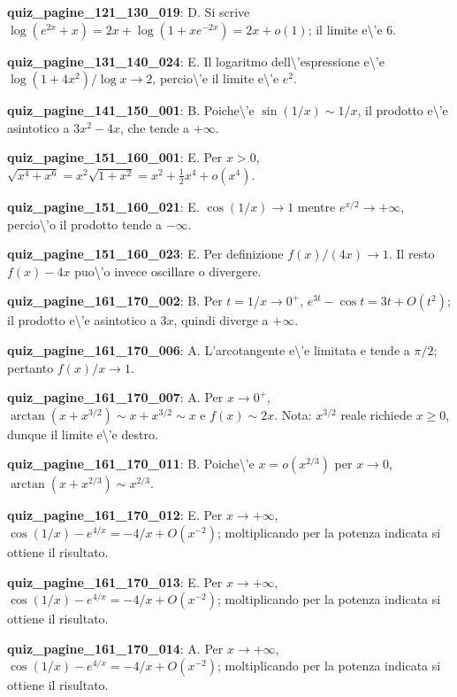 \documentclass[11pt,a4paper]{article}
\newcounter{quiz}
\begin{document}
\noindent\textbf{quiz\_pagine\_121\_130\_019}: D. Si scrive $\log(e^{2x}+x)=2x+\log(1+xe^{-2x})=2x+o(1)$; il limite e\textbackslash{}'e $6$.\par\medskip
\noindent\textbf{quiz\_pagine\_131\_140\_024}: E. Il logaritmo dell\textbackslash{}'espressione e\textbackslash{}'e $\log(1+4x^2)/\log x\to2$, percio\textbackslash{}'e il limite e\textbackslash{}'e $e^2$.\par\medskip
\noindent\textbf{quiz\_pagine\_141\_150\_001}: B. Poiche\textbackslash{}'e $\sin(1/x)\sim1/x$, il prodotto e\textbackslash{}'e asintotico a $3x^2-4x$, che tende a $+\infty$.\par\medskip
\noindent\textbf{quiz\_pagine\_151\_160\_001}: E. Per $x>0$, $\sqrt{x^4+x^6}=x^2\sqrt{1+x^2}=x^2+\frac12x^4+o(x^4)$.\par\medskip
\noindent\textbf{quiz\_pagine\_151\_160\_021}: E. $\cos(1/x)\to1$ mentre $e^{x/2}\to+\infty$, percio\textbackslash{}'o il prodotto tende a $-\infty$.\par\medskip
\noindent\textbf{quiz\_pagine\_151\_160\_023}: E. Per definizione $f(x)/(4x)\to1$. Il resto $f(x)-4x$ puo\textbackslash{}'o invece oscillare o divergere.\par\medskip
\noindent\textbf{quiz\_pagine\_161\_170\_002}: B. Per $t=1/x\to0^+$, $e^{3t}-\cos t=3t+O(t^2)$; il prodotto e\textbackslash{}'e asintotico a $3x$, quindi diverge a $+\infty$.\par\medskip
\noindent\textbf{quiz\_pagine\_161\_170\_006}: A. L'arcotangente e\textbackslash{}'e limitata e tende a $\pi/2$; pertanto $f(x)/x\to1$.\par\medskip
\noindent\textbf{quiz\_pagine\_161\_170\_007}: A. Per $x\to0^+$, $\arctan(x+x^{3/2})\sim x+x^{3/2}\sim x$ e $f(x)\sim2x$. Nota: $x^{3/2}$ reale richiede $x\geq0$, dunque il limite e\textbackslash{}'e destro.\par\medskip
\noindent\textbf{quiz\_pagine\_161\_170\_011}: B. Poiche\textbackslash{}'e $x=o(x^{2/3})$ per $x\to0$, $\arctan(x+x^{2/3})\sim x^{2/3}$.\par\medskip
\noindent\textbf{quiz\_pagine\_161\_170\_012}: E. Per $x\to+\infty$, $\cos(1/x)-e^{4/x}=-4/x+O(x^{-2})$; moltiplicando per la potenza indicata si ottiene il risultato.\par\medskip
\noindent\textbf{quiz\_pagine\_161\_170\_013}: E. Per $x\to+\infty$, $\cos(1/x)-e^{4/x}=-4/x+O(x^{-2})$; moltiplicando per la potenza indicata si ottiene il risultato.\par\medskip
\noindent\textbf{quiz\_pagine\_161\_170\_014}: A. Per $x\to+\infty$, $\cos(1/x)-e^{4/x}=-4/x+O(x^{-2})$; moltiplicando per la potenza indicata si ottiene il risultato.\par\medskip
\end{document}
